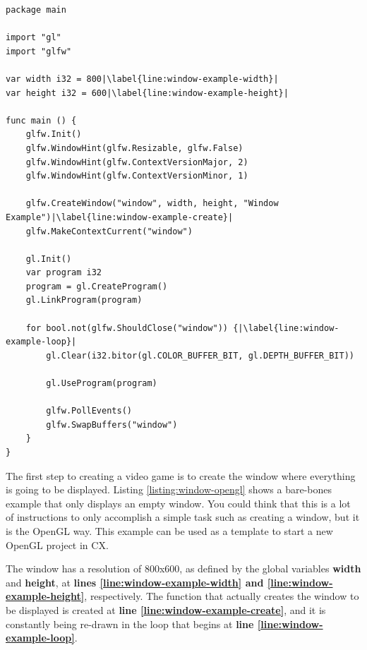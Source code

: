 \documentclass[11pt,fleqn,openany]{book} %
\begin{document}
\begin{lstlisting}[caption={Creating a window using OpenGL},captionpos=b,label={listing:window-opengl}]
package main

import "gl"
import "glfw"

var width i32 = 800|\label{line:window-example-width}|
var height i32 = 600|\label{line:window-example-height}|

func main () {
	glfw.Init()
	glfw.WindowHint(glfw.Resizable, glfw.False)
	glfw.WindowHint(glfw.ContextVersionMajor, 2)
	glfw.WindowHint(glfw.ContextVersionMinor, 1)

	glfw.CreateWindow("window", width, height, "Window Example")|\label{line:window-example-create}|
	glfw.MakeContextCurrent("window")
	
	gl.Init()
	var program i32
	program = gl.CreateProgram()
	gl.LinkProgram(program)
	
	for bool.not(glfw.ShouldClose("window")) {|\label{line:window-example-loop}|
		gl.Clear(i32.bitor(gl.COLOR_BUFFER_BIT, gl.DEPTH_BUFFER_BIT))

		gl.UseProgram(program)

		glfw.PollEvents()
		glfw.SwapBuffers("window")
	}
}
\end{lstlisting}

The first step to creating a video game is to create the window where everything is going to be displayed. Listing \ref{listing:window-opengl} shows a bare-bones example that only displays an empty window. You could think that this is a lot of instructions to only accomplish a simple task such as creating a window, but it is the OpenGL way. This example can be used as a template to start a new OpenGL project in CX.

The window has a resolution of 800x600, as defined by the global variables \textbf{width} and \textbf{height}, at \textbf{lines \ref{line:window-example-width} and \ref{line:window-example-height}}, respectively. The function that actually creates the window to be displayed is created at \textbf{line \ref{line:window-example-create}}, and it is constantly being re-drawn in the loop that begins at \textbf{line \ref{line:window-example-loop}}.
\end{document}
